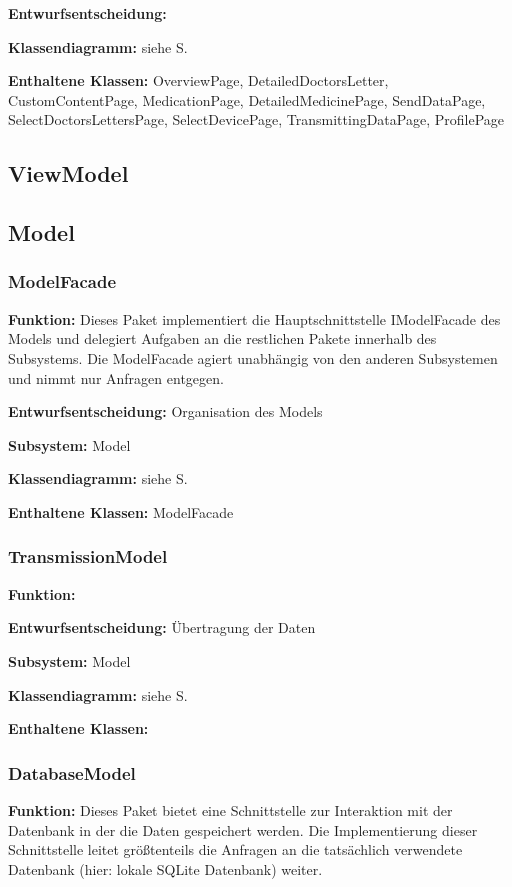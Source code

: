 \documentclass[a4paper]{scrreprt}
\begin{document}
\textbf{Entwurfsentscheidung:} %

\textbf{Klassendiagramm:} siehe S.

\textbf{Enthaltene Klassen:} OverviewPage, DetailedDoctorsLetter, CustomContentPage, MedicationPage, DetailedMedicinePage, SendDataPage, SelectDoctorsLettersPage, SelectDevicePage, TransmittingDataPage, ProfilePage
\subsection{ViewModel}
\subsection{Model}
\subsubsection{ModelFacade}
\textbf{Funktion:} Dieses Paket implementiert die Hauptschnittstelle IModelFacade des Models und delegiert Aufgaben an die restlichen Pakete innerhalb des Subsystems.
Die ModelFacade agiert unabhängig von den anderen Subsystemen und nimmt nur Anfragen entgegen.

\textbf{Entwurfsentscheidung:} Organisation des Models

\textbf{Subsystem:} Model

\textbf{Klassendiagramm:} siehe S.

\textbf{Enthaltene Klassen:} ModelFacade

\subsubsection{TransmissionModel}
\textbf{Funktion:}

\textbf{Entwurfsentscheidung:} Übertragung der Daten

\textbf{Subsystem:} Model

\textbf{Klassendiagramm:} siehe S.

\textbf{Enthaltene Klassen:} 

\subsubsection{DatabaseModel}
\textbf{Funktion:} Dieses Paket bietet eine Schnittstelle zur Interaktion mit der Datenbank in der die Daten gespeichert werden. 
Die Implementierung dieser Schnittstelle leitet größtenteils die Anfragen an die tatsächlich verwendete Datenbank (hier: lokale SQLite Datenbank) weiter.
\end{document}
